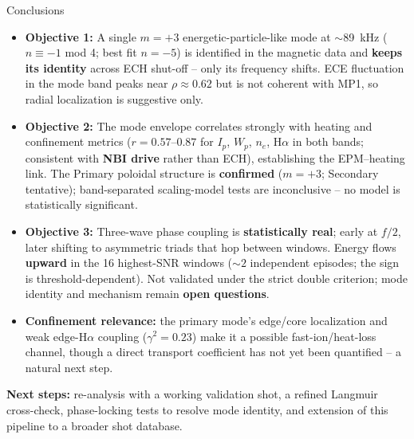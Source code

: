 \documentclass[aspectratio=169]{beamer}
\begin{document}
\begin{frame}{Conclusions}
    \footnotesize
    \begin{itemize}
        \item \textbf{Objective 1:} A single $m=+3$ energetic-particle-like mode at
        $\sim$\SI{89}{kHz} ($n\equiv-1$ mod 4; best fit $n=-5$) is identified in the
        magnetic data and \textbf{keeps its identity}
        across ECH shut-off -- only its frequency shifts. ECE fluctuation in the mode band
        peaks near $\rho\approx0.62$ but is not coherent with MP1, so radial localization
        is suggestive only.
        \item \textbf{Objective 2:} The mode envelope correlates strongly with heating and
        confinement metrics ($r=0.57$--$0.87$ for $I_p$, $W_p$, $n_e$, H$\alpha$ in both
        bands; consistent with \textbf{NBI drive} rather than ECH), establishing the
        EPM--heating link. The Primary poloidal structure is \textbf{confirmed} ($m=+3$; Secondary
        tentative); band-separated scaling-model tests are inconclusive -- no model is
        statistically significant.
        \item \textbf{Objective 3:} Three-wave phase coupling is \textbf{statistically real}; early at $f/2$, later shifting to asymmetric triads that hop between windows. Energy flows \textbf{upward} in the 16 highest-SNR windows (${\sim}2$ independent episodes; the sign is threshold-dependent). Not validated under the strict double criterion; mode identity and mechanism remain \textbf{open questions}.
        \item \textbf{Confinement relevance:} the primary mode's edge/core
        localization and weak edge-H$\alpha$ coupling ($\gamma^2=0.23$) make it a
        possible fast-ion/heat-loss channel, though a direct transport
        coefficient has not yet been quantified -- a natural next step.
    \end{itemize}
    \vspace{0.2cm}
    \textbf{Next steps:} re-analysis with a working validation shot, a
    refined Langmuir cross-check, phase-locking tests to resolve mode
    identity, and extension of this pipeline to a broader shot database.
\end{frame}
\end{document}

